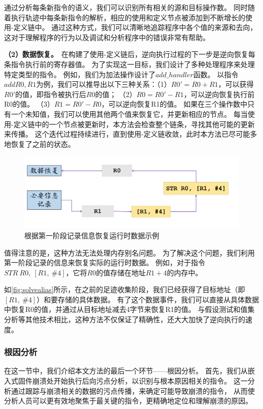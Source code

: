 通过分析每条新指令的语义，我们可以识别所有相关的源和目标操作数。
同时随着执行轨迹中每条新指令的解析，相应的使用和定义节点被添加到不断增长的使用-定义链中。
通过这种方式，我们可以清晰地追踪程序中各个值的来源和去向，这对于理解程序的行为以及调试和分析程序中的错误非常有帮助。

\textbf{（2）数据恢复。}\ 在构建了使用-定义链后，逆向执行过程的下一步是逆向恢复每条指令执行前的寄存器值。
为了实现这一目标，我们设计了多种处理程序来处理特定类型的指令。
例如，我们为加法操作设计了$add\_handler$函数。
以指令$add R0, R1$为例，我们可以推导出以下三种关系：（1）$R0'=R0+R1$，可以获得$R0'$的值，即指令被执行后$R0$的值；
（2）$R0=R0'-R1$，可以逆向恢复执行前R0的值。
（3）$R1=R0'-R0$，可以逆向恢复R1的值。
如果在三个操作数中只有一个未知值，我们可以使用其他两个值来恢复它，并更新相应的节点。
每当使用-定义链中的一个节点被更新时，本方法会检查整个链条，寻找其他可能的更新来传播。
这个迭代过程持续进行，直到使用-定义链收敛，此时本方法已尽可能多地恢复了之前的状态。

\begin{figure}[h]
    \centering
    \includegraphics[width=1.0\textwidth]{./figure/solvealias.png}
    \caption{根据第一阶段记录信息恢复运行时数据示例}
    \label{fig:solvealias}
\end{figure}

值得注意的是，这种方法无法处理内存别名问题。
为了解决这个问题，我们利用第一阶段记录的信息来恢复实际的运行时数据。
例如，对于指令$STR\ R0,\ [R1,\ \#4]$，它将$R0$的值存储在地址$R1+4$的内存中。

如\autoref{fig:solvealias}所示，在之前的足迹收集阶段，我们已经获得了目标地址（即$[R1,\ \#4]$）和要存储的具体数据。
有了这个数据事件，我们可以直接从具体数据中恢复R0的值，并通过从目标地址减去4字节来恢复R1的值。
与假设测试和值集分析等其他技术相比，这种方法不仅保证了精确性，还大大加快了逆向执行的速度。
\subsubsection{根因分析}
在这一节中，我们介绍本文方法的最后一个环节——根因分析。
首先，我们从嵌入式固件崩溃处开始执行后向污点分析，以识别与根本原因相关的指令。
这一分析通过跟踪与崩溃相关的数据的污点传播，来确定可能导致崩溃的指令，
从而使分析人员可以更有效地聚焦于最关键的指令，更精确地定位和理解崩溃的原因。

